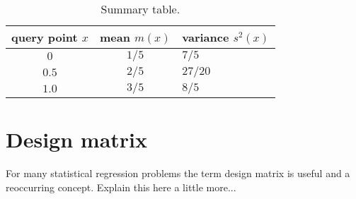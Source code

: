 \documentclass[11pt, DINA4, fleqn]{amsart}
\begin{document}

\renewcommand{\arraystretch}{1.2}

\begin{center}
	\begin{table}
	\begin{tabularx}{8.0cm}{ccX}
		query point $x$ & mean $m(x)$ & variance $s^2(x)$\\
		\hline
		$0$ & $1/5$ & $7/5$ \\  
		$0.5$ & $2/5$ & $27/20$ \\
		$1.0$ & $3/5$ & $8/5$ \\   
	\end{tabularx}

	 \caption{Summary table.\label{tbl:benchmarkTable}}

\end{table}
\end{center}

\section{Design matrix}
For many statistical regression problems the term design matrix is useful and a reoccurring concept. Explain this here a little more...
\end{document}
